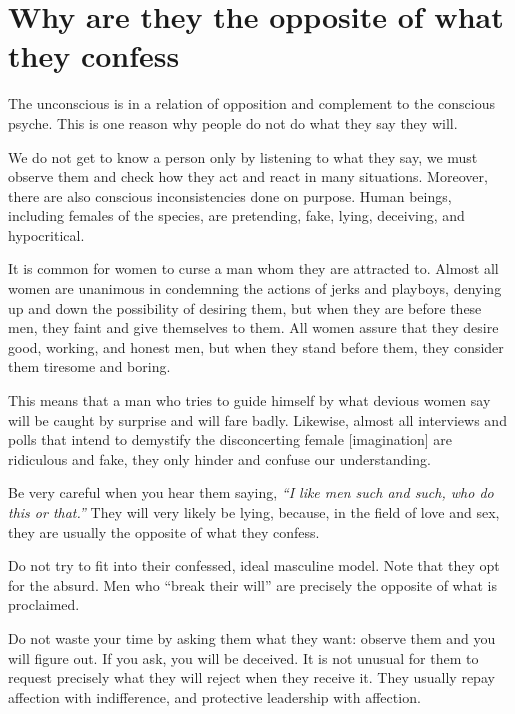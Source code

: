 \section{Why are they the opposite of what they confess}

\par The unconscious is in a relation of opposition and complement to the conscious psyche. This is one reason why people do not do what they say they will.

\par We do not get to know a person only by listening to what they say, we must observe them and check how they act and react in many situations. Moreover, there are also conscious inconsistencies done on purpose. Human beings, including females of the species, are pretending, fake, lying, deceiving, and hypocritical.

\par It is common for women to curse a man whom they are attracted to. Almost all women are unanimous in condemning the actions of jerks and playboys, denying up and down the possibility of desiring them, but when they are before these men, they faint and give themselves to them. All women assure that they desire good, working, and honest men, but when they stand before them, they consider them tiresome and boring.

\par This means that a man who tries to guide himself by what devious women say will be caught by surprise and will fare badly. Likewise, almost all interviews and polls that intend to demystify the disconcerting female [imagination] are ridiculous and fake, they only hinder and confuse our understanding.

\par Be very careful when you hear them saying, \textit{\enquote{I like men such and such, who do this or that.}} They will very likely be lying, because, in the field of love and sex, they are usually the opposite of what they confess.

\par Do not try to fit into their confessed, ideal masculine model. Note that they opt for the absurd. Men who \enquote{break their will} are precisely the opposite of what is proclaimed.

\par Do not waste your time by asking them what they want: observe them and you will figure out. If you ask, you will be deceived. It is not unusual for them to request precisely what they will reject when they receive it. They usually repay affection with indifference, and protective leadership with affection.

